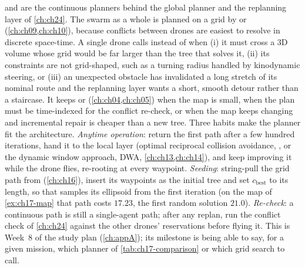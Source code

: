 \begin{dronebox}
\rrtstar and \irrtstar are the continuous planners behind the global planner
and the replanning layer of \cref{ch:ch24}. The swarm as a whole is planned on a
grid by \cbs or \ecbs (\cref{ch:ch09,ch:ch10}), because conflicts between
drones are easiest to resolve in discrete space-time. A
single drone calls \rrtstar instead of \astar when (i) it must cross a 3D
volume whose grid would be far larger than the tree that solves it,
(ii) its constraints are not grid-shaped, such as a turning radius handled
by kinodynamic steering, or (iii) an unexpected obstacle has invalidated a
long stretch of its nominal route and the replanning layer wants a short,
smooth detour rather than a staircase. It
keeps \astar or \dstarlite (\cref{ch:ch04,ch:ch05}) when the map is small,
when the plan must be time-indexed for the conflict re-check, or when the
map keeps changing and incremental repair is cheaper than a new tree.
Three habits make the planner fit the architecture. \emph{Anytime
operation}: return the first path after a few hundred iterations, hand it
to the local layer (optimal reciprocal collision avoidance, \orca, or the
dynamic window approach, DWA, \cref{ch:ch13,ch:ch14}), and keep
improving it while the drone flies, re-rooting at every waypoint.
\emph{Seeding}: string-pull the grid path from \cbs (\cref{ch:ch16}),
insert its waypoints as the initial tree and set $c_{\mathrm{best}}$ to its
length, so that \irrtstar samples its ellipsoid from the first iteration
(on the map of \cref{ex:ch17-map} that path costs $17.23$, the first random
solution $21.0$). \emph{Re-check}: a continuous path
is still a single-agent path; after any replan, run the conflict check of
\cref{ch:ch24} against the other drones' reservations before flying it.
This is Week~8 of the study plan (\cref{ch:appA}); its milestone is being
able to say, for a given mission, which planner of
\cref{tab:ch17-comparison} or which grid search to call.
\end{dronebox}

